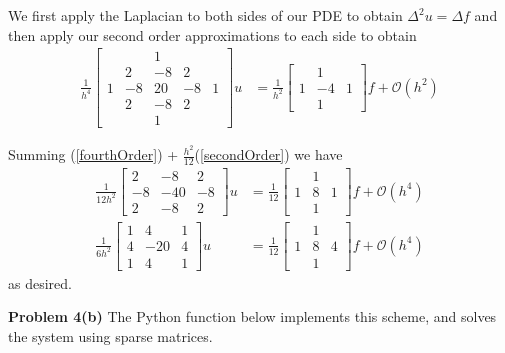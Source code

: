 \documentclass[12pt]{article}
\newcommand{\problem}[1]{\hspace{-4 ex} \large \textbf{Problem #1} }
\begin{document}
We first apply the Laplacian to both sides of our PDE to obtain $\Delta^2 u = \Delta f$ and then apply our second order approximations to each side to obtain
\begin{align}
	\frac{1}{h^4}\begin{bmatrix}&&1&&\\&2&-8&2&\\1&-8&20&-8&1\\&2&-8&2&\\&&1&&\end{bmatrix}u & = 
	\frac{1}{h^2}\begin{bmatrix}&1&\\1&-4&1\\&1&\end{bmatrix}f + \mathcal{O}(h^2) \label{secondOrder}
\end{align}

Summing (\ref{fourthOrder}) + $\frac{h^2}{12}$(\ref{secondOrder}) we have
\begin{align*}
	\frac{1}{12h^2}\begin{bmatrix}2&-8&2\\-8&-40&-8\\2&-8&2\end{bmatrix}u &= 
	\frac{1}{12}\begin{bmatrix}&1&\\1&8&1\\&1&\end{bmatrix}f + \mathcal{O}(h^4)\\
	\frac{1}{6h^2}\begin{bmatrix}1 & 4 & 1\\4 & -20&4\\1&4&1\end{bmatrix}u &=
	\frac{1}{12}\begin{bmatrix} & 1 & \\1 & 8&4\\&1&\end{bmatrix}f + \mathcal{O}(h^4)
\end{align*}
as desired.

\bigbreak
\problem{4(b)} The Python function below implements this scheme, and solves the system using sparse matrices.
\end{document}
